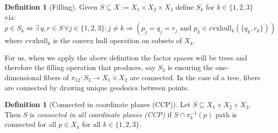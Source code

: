 \documentclass[12pt,parskip=full]{report}
\theoremstyle{plain}
\theoremstyle{definition}
\newtheorem{dfn}[thm]{Definition}
\begin{document}
\begin{dfn}
	[Filling]
	\label{defn:filling}
    Given \(S \subseteq X := X_1\times X_2\times X_3\) define \(S_{k}\) for \(k \in \{1,2,3\}\) via: 
    \[
        p \in S_{k} \iff \exists 
        \,q,r\in S\, \forall j\in \{1,2,3\}: j\neq k 
        \Longrightarrow ( p_{j} = q_{j} = r_{j}
        \text{ and } p_{k} \in \text{cvxhull}_k (\{q_{k} , r_{k}\}))
    \] 
    where \(\text{cvxhull}_k\) is the convex hull operation on subsets of \(X_k\).
\end{dfn}

For us, when we apply the above definition the factor spaces will be trees and therefore the filling operation that produces, say \(S_3\) is ensuring the one-dimensional fibers of \(\pi_{12}: S_3\to X_1\times X_2\) are connected. In the case of a tree, fibers are connected by drawing unique geodesics between points.



\begin{dfn}
[Connected in coordinate planes (CCP)]
    \label{defn:ccp} 
    Let \(S \subseteq X_1\times X_2\times X_3\). Then \(S\) is \emph{connected in all coordinate planes (CCP)} if \(S \cap \pi_{k}^{-1} (p)\) path is connected for all \(p \in X_{k}\) for all \(k\in \{1,2,3\}\).
\end{dfn}
\end{document}
